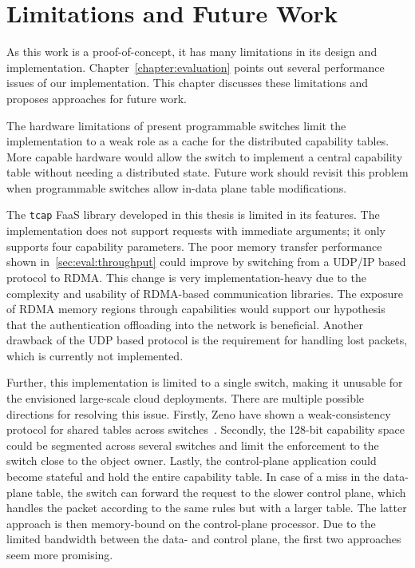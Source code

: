 \chapter{Limitations and Future Work}
\thispagestyle{scrheadings}
As this work is a proof-of-concept, it has many limitations in its design and implementation. Chapter~\ref{chapter:evaluation} points out several performance issues of our implementation. This chapter discusses these limitations and proposes approaches for future work.

The hardware limitations of present programmable switches limit the implementation to a weak role as a cache for the distributed capability tables. More capable hardware would allow the switch to implement a central capability table without needing a distributed state. Future work should revisit this problem when programmable switches allow in-data plane table modifications.

The \texttt{tcap} FaaS library developed in this thesis is limited in its features. The implementation does not support requests with immediate arguments; it only supports four capability parameters. The poor memory transfer performance shown in~\ref{sec:eval:throughput} could improve by switching from a \ac{UDP}/\ac{IP} based protocol to \ac{RDMA}\@. This change is very implementation-heavy due to the complexity and usability of \ac{RDMA}-based communication libraries. The exposure of RDMA memory regions through capabilities would support our hypothesis that the authentication offloading into the network is beneficial. Another drawback of the \ac{UDP} based protocol is the requirement for handling lost packets, which is currently not implemented.

Further, this implementation is limited to a single switch, making it unusable for the envisioned large-scale cloud deployments. There are multiple possible directions for resolving this issue. Firstly, Zeno \etal{} have shown a weak-consistency protocol for shared tables across switches~\cite{zenoSwiShmemDistributedShared2020}. Secondly, the 128-bit capability space could be segmented across several switches and limit the enforcement to the switch close to the object owner. Lastly, the control-plane application could become stateful and hold the entire capability table. In case of a miss in the data-plane table, the switch can forward the request to the slower control plane, which handles the packet according to the same rules but with a larger table. The latter approach is then memory-bound on the control-plane processor. Due to the limited bandwidth between the data- and control plane, the first two approaches seem more promising.


